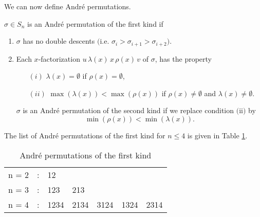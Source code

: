 We can now define Andr\'e permutations.
\begin{define} $\sigma \in S_n$ is an Andr\'e permutation of the first kind if 
\begin{enumerate}
\item $\sigma$ has 
no double descents $($i.e. $\sigma_i > \sigma_{i+1} > \sigma_{i+2})$.
\item
Each  $x$-factorization $u\,\lambda(x)\,x\,\rho(x)\,v$ of $\sigma$,  
has the
property 
\begin{enumerate}
 \item[$(i)$]$\lambda(x) = \emptyset$ if $\rho(x) = \emptyset$,    \item[$(ii)$]$\max(\lambda(x)) < \max(\rho(x))$    if $\rho(x) \neq \emptyset$ and
$\lambda(x) \neq \emptyset$.
\end{enumerate}
$\sigma$ is an Andr\'e permutation of the second kind if we replace condition
$($ii$)$ by $$\min(\rho(x)) < \min(\lambda(x)).$$
\end{enumerate}
\end{define}

The list of Andr\'e permutations of the first kind for $n\leq 4$ is
given in Table \ref{T_andre}. 

\begin{table}[top]
\begin{center}
\begin{tabular}{lllllll}
n = 2 &:& 12   &      &      &       &     \\
n = 3 &:& 123  & 213  &      &       &     \\
n = 4 &:& 1234 & 2134 & 3124 &  1324 & 2314\\
\end{tabular}
\end{center}
\caption{Andr\'e permutations of the first kind}
\label{T_andre}
\end{table}

